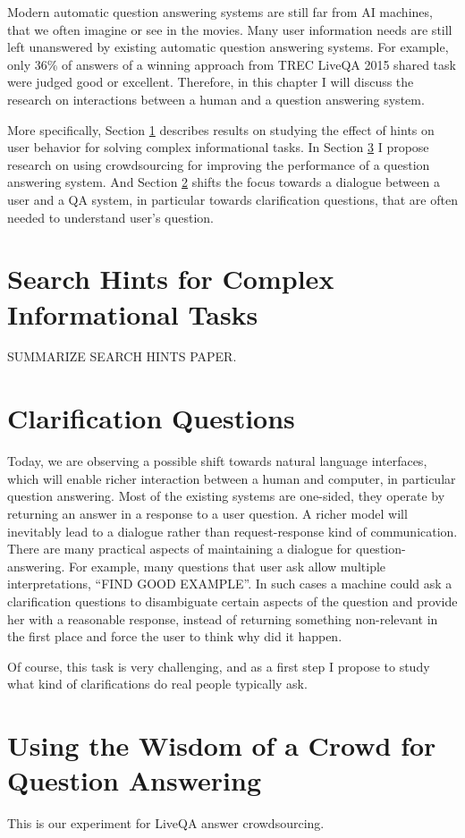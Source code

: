 %

\label{chapter:users}

\noindent

Modern automatic question answering systems are still far from AI machines, that we often imagine or see in the movies.
Many user information needs are still left unanswered by existing automatic question answering systems.
For example, only 36\% of answers of a winning approach from TREC LiveQA 2015 shared task were judged good or excellent.
Therefore, in this chapter I will discuss the research on interactions between a human and a question answering system.

More specifically, Section \ref{sec:user:hints} describes results on studying the effect of hints on user behavior for solving complex informational tasks.
In Section \ref{sec:user:crowd} I propose research on using crowdsourcing for improving the performance of a question answering system.
And Section \ref{sec:user:clarification} shifts the focus towards a dialogue between a user and a QA system, in particular towards clarification questions, that are often needed to understand user's question.

\section{Search Hints for Complex Informational Tasks}
\label{sec:user:hints}

SUMMARIZE SEARCH HINTS PAPER.

\section{Clarification Questions}
\label{sec:user:clarification}

Today, we are observing a possible shift towards natural language interfaces, which will enable richer interaction between a human and computer, in particular question answering.
Most of the existing systems are one-sided, \ie they operate by returning an answer in a response to a user question.
A richer model will inevitably lead to a dialogue rather than request-response kind of communication.
There are many practical aspects of maintaining a dialogue for question-answering.
For example, many questions that user ask allow multiple interpretations, \eg ``FIND GOOD EXAMPLE''.
In such cases a machine could ask a clarification questions to disambiguate certain aspects of the question and provide her with a reasonable response, instead of returning something non-relevant in the first place and force the user to think why did it happen.

Of course, this task is very challenging, and as a first step I propose to study what kind of clarifications do real people typically ask.

\section{Using the Wisdom of a Crowd for Question Answering}
\label{sec:user:crowd}

This is our experiment for LiveQA answer crowdsourcing.
